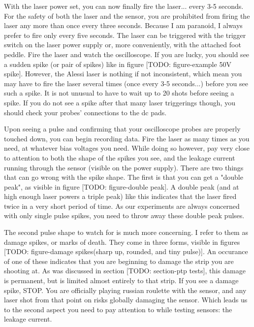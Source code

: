\documentclass{report}
\begin{document}
            With the laser power set, you can now finally fire the laser... every 3-5 seconds. For the safety of both the laser and the sensor, you are prohibited from firing the laser any more than once every three seconds. Because I am paranoid, I always prefer to fire only every five seconds. The laser can be triggered with the trigger switch on the laser power supply or, more conveniently, with the attached foot peddle. Fire the laser and watch the oscilloscope. If you are lucky, you should see a sudden spike (or pair of spikes) like in figure [TODO: figure-example 50V spike]. However, the Alessi laser is nothing if not inconsistent, which mean you may have to fire the laser several times (once every 3-5 seconds...) before you see such a spike. It is not unusual to have to wait up to 20 shots before seeing a spike. If you do not see a spike after that many laser triggerings though, you should check your probes' connections to the dc pads.

            Upon seeing a pulse and confirming that your oscilloscope probes are properly touched down, you can begin recording data. Fire the laser as many times as you need, at whatever bias voltages you need. While doing so however, pay very close to attention to both the shape of the spikes you see, and the leakage current running through the sensor (visible on the power supply). There are two things that can go wrong with the spike shape. The first is that you can get a "double peak", as visible in figure [TODO: figure-double peak]. A double peak (and at high enough laser powers a triple peak) like this indicates that the laser fired twice in a very short period of time. As our experiments are always concerned with only single pulse spikes, you need to throw away these double peak pulses. 
            
            The second pulse shape to watch for is much more concerning. I refer to them as damage spikes, or marks of death. They come in three forms, visible in figures [TODO: figure-damage spikes(sharp up, rounded, and tiny pulse)]. An occurance of one of these indicates that you are beginning to damage the strip you are shooting at. As was discussed in section [TODO: section-ptp tests], this damage is permanent, but is limited almost entirely to that strip. If you see a damage spike, STOP. You are officially playing russian roulette with the sensor, and any laser shot from that point on risks globally damaging the sensor. Which leads us to the second aspect you need to pay attention to while testing sensors: the leakage current.
\end{document}
